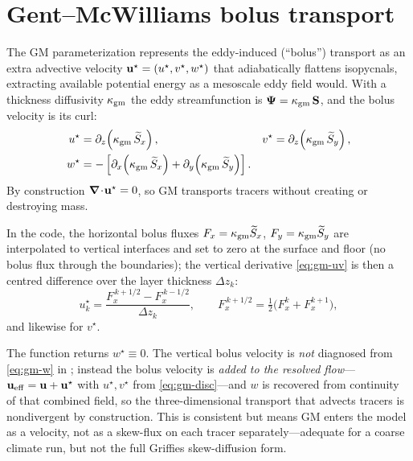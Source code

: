 \section{Gent--McWilliams bolus transport}

The GM parameterization \citep{gentmcwilliams1990} represents the eddy-induced
(``bolus'') transport as an extra advective velocity $\mathbf{u}^\star=(u^\star,v^\star,w^\star)$
that adiabatically flattens isopycnals, extracting available potential energy as a
mesoscale eddy field would. With a thickness diffusivity $\kappa_{\mathrm{gm}}$ the eddy streamfunction
is $\boldsymbol{\Psi}=\kappa_{\mathrm{gm}}\,\mathbf{S}$, and the bolus velocity is its curl:
\begin{align}
u^\star &= \partial_z\!\left(\kappa_{\mathrm{gm}}\,\widetilde S_x\right), &
v^\star &= \partial_z\!\left(\kappa_{\mathrm{gm}}\,\widetilde S_y\right), \label{eq:gm-uv}\\
w^\star &= -\left[\partial_x\!\left(\kappa_{\mathrm{gm}}\,\widetilde S_x\right) + \partial_y\!\left(\kappa_{\mathrm{gm}}\,\widetilde S_y\right)\right].
\label{eq:gm-w}
\end{align}
By construction $\boldsymbol{\nabla}\!\cdot\!\mathbf{u}^\star=0$, so GM transports tracers without creating or
destroying mass.

In the code, the horizontal bolus fluxes $F_x=\kappa_{\mathrm{gm}}\widetilde S_x$, $F_y=\kappa_{\mathrm{gm}}\widetilde S_y$
are interpolated to vertical interfaces and set to zero at the surface and floor
(no bolus flux through the boundaries); the vertical derivative
\eqref{eq:gm-uv} is then a centred difference over the layer thickness $\Delta z_k$:
\begin{equation}
u^\star_k = \frac{F_x^{\,k+1/2} - F_x^{\,k-1/2}}{\Delta z_k}, \qquad
F_x^{\,k+1/2} = \tfrac12\big(F_x^{k}+F_x^{k+1}\big),
\label{eq:gm-disc}
\end{equation}
and likewise for $v^\star$.

\begin{remark}
The function returns $w^\star\equiv 0$. The vertical bolus velocity is \emph{not}
diagnosed from \eqref{eq:gm-w} in ; instead the bolus velocity is
\emph{added to the resolved flow}---$\mathbf{u}_{\mathrm{eff}}=\mathbf{u}+\mathbf{u}^\star$ with
$u^\star,v^\star$ from \eqref{eq:gm-disc}---and $w$ is recovered from continuity of
that combined field, so the three-dimensional transport that advects tracers is
nondivergent by construction.
This is consistent but means GM enters the model as a velocity, not as a skew-flux on
each tracer separately---adequate for a coarse climate run, but not the full
Griffies skew-diffusion form.
\end{remark}

